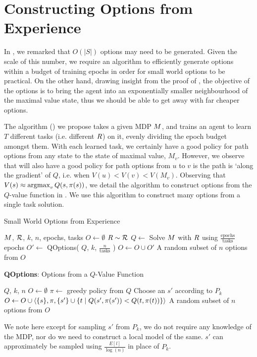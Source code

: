 \section{Constructing Options from Experience} 
\label{sec:algo}

In , we remarked that $O(|S|)$ options may need to be
generated. Given the scale of this number, we require an algorithm to
efficiently generate options within a budget of training epochs in order
for small world options to be practical. On the other hand, drawing
insight from the proof of , the objective of the
options is to bring the agent into an exponentially smaller
neighbourhood of the maximal value state, thus we should be able to get
away with far cheaper options.

The algorithm () we propose takes
a given MDP $M$, and trains an agent to learn $T$ different tasks
(i.e. different $R$) on it, evenly dividing the epoch budget
amongst them. With each learned task, we certainly have a good policy
for path options from any state to the state of maximal value, $M_v$.
However, we observe that will also have a good policy for path options
from $u$ to $v$ is the path is `along the gradient' of $Q$, i.e. when
$V(u) < V(v) < V(M_v)$. Observing that $V(s) \approx \operatorname{argmax}_{v}
Q(s,\pi(s))$, we detail the algorithm to construct options from the
$Q$-value function in . We use this algorithm to
construct many options from a single task solution.

\begin{algorithm}[H]
  \caption{Small World Options from Experience}
  \label{algo:small-world-experience}
  \begin{algorithmic}[1]
      \REQUIRE $M$, $\mathcal{R}$, $k$, $n$, epochs, tasks
      \STATE $O \gets \emptyset$
        \STATE $R \sim \mathcal{R}$
        \STATE $Q \gets $ Solve $M$ with $R$ using
            $\frac{\textrm{epochs}}{\textrm{tasks}}$ epochs
        \STATE $O' \gets $ QOptions( $Q$, $k$,
            $\frac{n}{\textrm{tasks}}$ )
        \STATE $O \gets O \cup O'$
      \ENDFOR
      \RETURN A random subset of $n$ options from $O$
  \end{algorithmic}
\end{algorithm}
\begin{algorithm}[H]
  \caption{{\bf QOptions}: Options from a $Q$-Value Function}
  \label{algo:qoptions}
  \begin{algorithmic}[1]
      \REQUIRE $Q$, $k$, $n$
      \STATE $O \gets \emptyset$
      \STATE $\pi \gets $ greedy policy from $Q$
        \STATE Choose an $s'$ according to $P_k$
          \STATE $O \gets O \cup \langle \{s\}, \pi, \{s'\} \cup \{t \mid Q(s',\pi(s')) < Q(t, \pi(t))\}  \rangle$
        \ENDIF
      \RETURN A random subset of $n$ options from $O$
  \end{algorithmic}
\end{algorithm}

We note here except for sampling $s'$ from $P_k$, we do not require any knowledge of the MDP, nor do we need to construct a local model of the same. $s'$ can approximately be sampled using $\frac{E[l]}{\log(n)}$ in place of $P_k$. 

